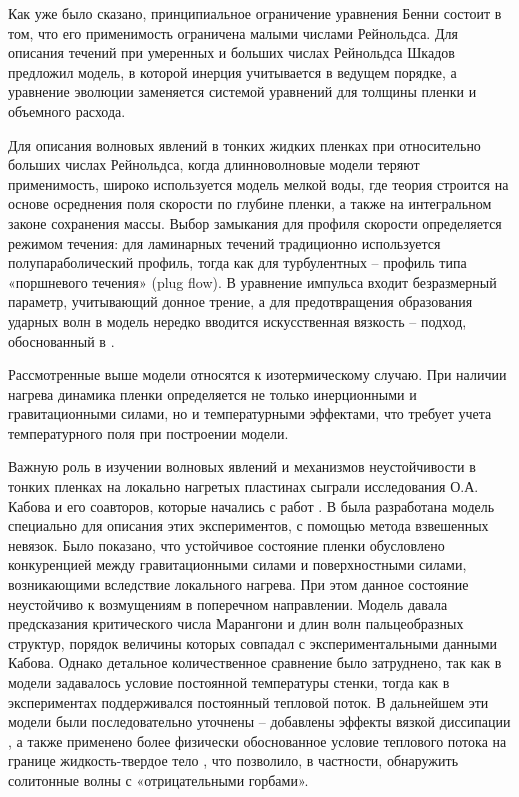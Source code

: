 \documentclass[12pt,a4paper]{article}
\begin{document}
Как уже было сказано, принципиальное ограничение уравнения Бенни состоит в том, что его применимость ограничена малыми числами Рейнольдса. Для описания течений при умеренных и больших числах Рейнольдса Шкадов \cite{Shkadov1967, Shkadov1968} предложил модель, в которой инерция учитывается в ведущем порядке, а уравнение эволюции заменяется системой уравнений для толщины пленки и объемного расхода. 

Для описания волновых явлений в тонких жидких пленках при относительно больших числах Рейнольдса, когда длинноволновые модели теряют применимость, широко используется модель мелкой воды, где теория строится на основе осреднения поля скорости по глубине пленки, а также на интегральном законе сохранения массы. Выбор замыкания для профиля скорости определяется режимом течения: для ламинарных течений традиционно используется полупараболический профиль, тогда как для турбулентных -- профиль типа «поршневого течения» (plug flow). В уравнение импульса входит безразмерный параметр, учитывающий донное трение, а для предотвращения образования ударных волн в модель нередко вводится искусственная вязкость -- подход, обоснованный в \cite{Needham1984, Chang2000}.


Рассмотренные выше модели относятся к изотермическому случаю. При наличии нагрева динамика пленки определяется не только инерционными и гравитационными силами, но и температурными эффектами, что требует учета температурного поля при построении модели.

Важную роль в изучении волновых явлений и механизмов неустойчивости в тонких пленках на локально нагретых пластинах сыграли исследования О.А. Кабова и его соавторов, которые начались с работ \cite{Kabov1998, Kabov2001}. В \cite{Kalliadasis2003} была разработана модель специально для описания этих экспериментов, с помощью метода взвешенных невязок. Было показано, что устойчивое состояние пленки обусловлено конкуренцией между гравитационными силами и поверхностными силами, возникающими вследствие локального нагрева. При этом данное состояние неустойчиво к возмущениям в поперечном направлении. Модель давала предсказания критического числа Марангони и длин волн пальцеобразных структур, порядок величины которых совпадал с экспериментальными данными Кабова. Однако детальное количественное сравнение было затруднено, так как в модели задавалось условие постоянной температуры стенки, тогда как в экспериментах поддерживался постоянный тепловой поток.
В дальнейшем эти модели были последовательно уточнены -- добавлены эффекты вязкой диссипации \cite{RuyerQuil2005, Scheid2005}, а также применено более физически обоснованное условие теплового потока на границе жидкость-твердое тело \cite{Trevelyan2007}, что позволило, в частности, обнаружить солитонные волны с «отрицательными горбами».
\end{document}
